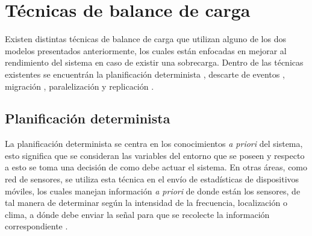 
\section{Técnicas de balance de carga}

Existen distintas técnicas de balance de carga que utilizan alguno de los dos modelos presentados anteriormente, los cuales están enfocadas en mejorar al rendimiento del sistema en caso de existir una sobrecarga. Dentro de las técnicas existentes se encuentrán la planificación determinista \citep{XuCTS14, DongTS07}, descarte de eventos \citep{SheuC09}, migración \citep{XingZH05}, paralelización \citep{GulisanoJPSV12, IshiiS11, GedikSHW14} y replicación \citep{FernandezMKP13}.

\subsection{Planificación determinista}

La planificación determinista se centra en los conocimientos \textit{a priori} del sistema, esto significa que se consideran las variables del entorno que se poseen y respecto a esto se toma una decisión de como debe actuar el sistema. En otras áreas, como red de sensores, se utiliza esta técnica en el envío de estadísticas de dispositivos móviles, los cuales manejan información \textit{a priori} de donde están los sensores, de tal manera de determinar según la intensidad de la frecuencia, localización o clima, a dónde debe enviar la señal para que se recolecte la información correspondiente \citep{DongTS07}.

